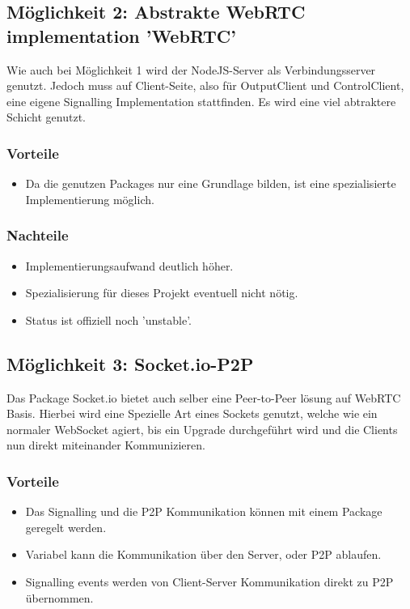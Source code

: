 \subsection{Möglichkeit 2: Abstrakte WebRTC implementation 'WebRTC'}
Wie auch bei Möglichkeit 1 wird der NodeJS-Server als Verbindungsserver genutzt. 
Jedoch muss auf Client-Seite, also für OutputClient und ControlClient, eine 
eigene Signalling Implementation stattfinden. Es wird eine viel abtraktere 
Schicht genutzt.

\subsubsection{Vorteile}
\begin{itemize}
\item
Da die genutzen Packages nur eine Grundlage bilden, ist eine spezialisierte 
Implementierung möglich.
\end{itemize}

\subsubsection{Nachteile}
\begin{itemize}
\item
Implementierungsaufwand deutlich höher.

\item
Spezialisierung für dieses Projekt eventuell nicht nötig.

\item
Status ist offiziell noch 'unstable'.
\end{itemize}



\subsection{Möglichkeit 3: Socket.io-P2P}
Das Package Socket.io bietet auch selber eine Peer-to-Peer lösung auf WebRTC 
Basis. Hierbei wird eine Spezielle Art eines Sockets genutzt, welche wie ein 
normaler WebSocket agiert, bis ein Upgrade durchgeführt wird und die Clients nun 
direkt miteinander Kommunizieren.

\subsubsection{Vorteile}
\begin{itemize}
\item
Das Signalling und die P2P Kommunikation können mit einem Package geregelt 
werden.

\item
Variabel kann die Kommunikation über den Server, oder P2P ablaufen.

\item
Signalling events werden von Client-Server Kommunikation direkt zu P2P 
übernommen.
\end{itemize}

